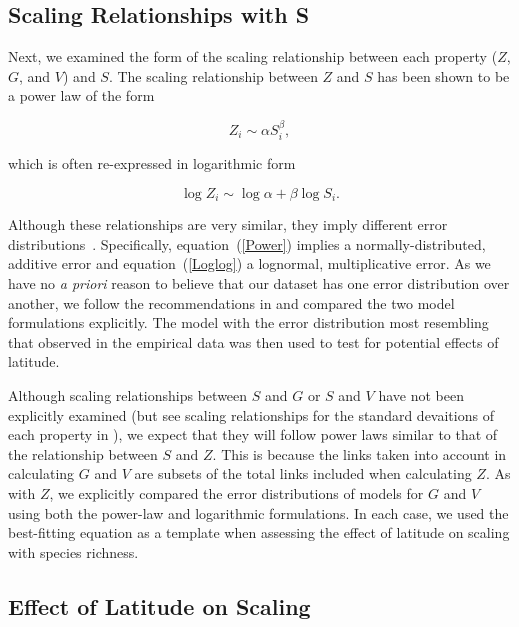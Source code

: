 \documentclass[12pt]{article}
\begin{document}
\subsection*{Scaling Relationships with S}

  Next, we examined the form of the scaling relationship between each 
  property ($Z$, $G$, and $V$) and $S$. The scaling relationship between $Z$ and 
  $S$ has been shown to be a power law \citep{Riede2010} of the form 

  \begin{equation}
  \label{Power}
  Z_{i} \sim \alpha S_{i}^{\beta}  ,
  \end{equation}

  \noindent which is often re-expressed in logarithmic form 

  \begin{equation}
  \label{Loglog}
  \log{Z_{i}} \sim \log{\alpha} + \beta\log{S_{i}}  .
  \end{equation}


  \noindent Although these relationships are very similar, they imply different error distributions~\citep{Xiao2011}.
  Specifically, equation~(\ref{Power}) implies a normally-distributed, additive error and equation~(\ref{Loglog}) a lognormal,
  multiplicative error. As we have no \emph{a priori} reason to believe that our dataset has one error distribution
  over another, we follow the recommendations in \citet{Xiao2011} and compared the two
  model formulations explicitly. The model with the error distribution most resembling that observed in the empirical
  data was then used to test for potential effects of latitude.


  Although scaling relationships between $S$ and $G$ or $S$ and $V$ have not been explicitly examined (but see scaling 
  relationships for the standard devaitions of each property in \citet{Riede2010}), we expect that they will follow
  power laws similar to that of the relationship between $S$ and $Z$. This is because the links taken into account in
  calculating $G$ and $V$ are subsets of the total links included when calculating $Z$. As with $Z$, we explicitly 
  compared the error distributions of models for $G$ and $V$ using both the power-law and logarithmic formulations. 
  In each case, we used the best-fitting equation as a template when assessing the effect of latitude on scaling with
  species richness.



\subsection*{Effect of Latitude on Scaling}
\end{document}
